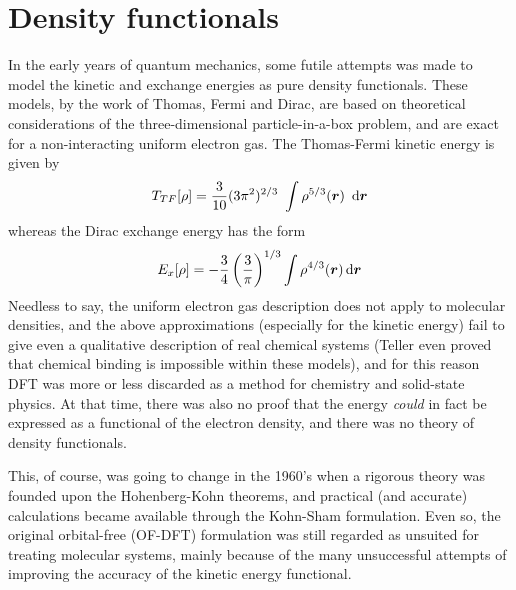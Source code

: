 \section{Density functionals}
In the early years of quantum mechanics, some futile attempts was made to model the kinetic and exchange energies
as pure density functionals. These models, by the work of Thomas\cite{Thomas:1927}, Fermi\cite{Fermi:1927} and 
Dirac\cite{Dirac:1929}, 
are based on theoretical considerations of the three-dimensional particle-in-a-box problem, and are exact for a 
non-interacting uniform electron gas. The Thomas-Fermi kinetic energy is given by
\begin{equation}
    \label{eq:thomas-fermi}
    T_{TF}[\rho] = \frac{3}{10}(3\pi^2)^{2/3} \int \rho^{5/3}(\bs{r}) \ud \bs{r}
\end{equation}
whereas the Dirac exchange energy has the form
\begin{equation}
    \label{eq:dirac}
    E_x[\rho] = -\frac{3}{4}\left(\frac{3}{\pi}\right)^{1/3} \int \rho^{4/3}(\boldsymbol r) \,\mathrm{d} \boldsymbol r
\end{equation}
Needless to say, the uniform electron gas description does not apply to molecular densities, and the above
approximations (especially for the kinetic energy) fail to give even a qualitative description of real chemical 
systems (Teller\cite{Teller:1962} even proved that chemical binding is impossible within these models), and for this 
reason DFT was more or less discarded as a method for chemistry and solid-state physics. At that time, there was 
also no proof that the energy \emph{could} in fact be expressed as a functional of the electron density, 
and there was no theory of density functionals. 

This, of course, was going to change in the 1960's when a rigorous
theory was founded upon the Hohenberg-Kohn theorems, and practical (and accurate) calculations became available
through the Kohn-Sham formulation. Even so, the original orbital-free (OF-DFT) formulation was still regarded as
unsuited for treating molecular systems, mainly because of the many unsuccessful attempts of improving the accuracy 
of the kinetic energy functional.

